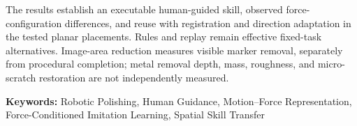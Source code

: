 The results establish an executable human-guided skill, observed force-configuration differences, and reuse with registration and direction adaptation in the tested planar placements. Rules and replay remain effective fixed-task alternatives. Image-area reduction measures visible marker removal, separately from procedural completion; metal removal depth, mass, roughness, and micro-scratch restoration are not independently measured.

\vspace{.3cm}
\noindent\textbf{Keywords:} Robotic Polishing, Human Guidance, Motion--Force Representation, Force-Conditioned Imitation Learning, Spatial Skill Transfer
